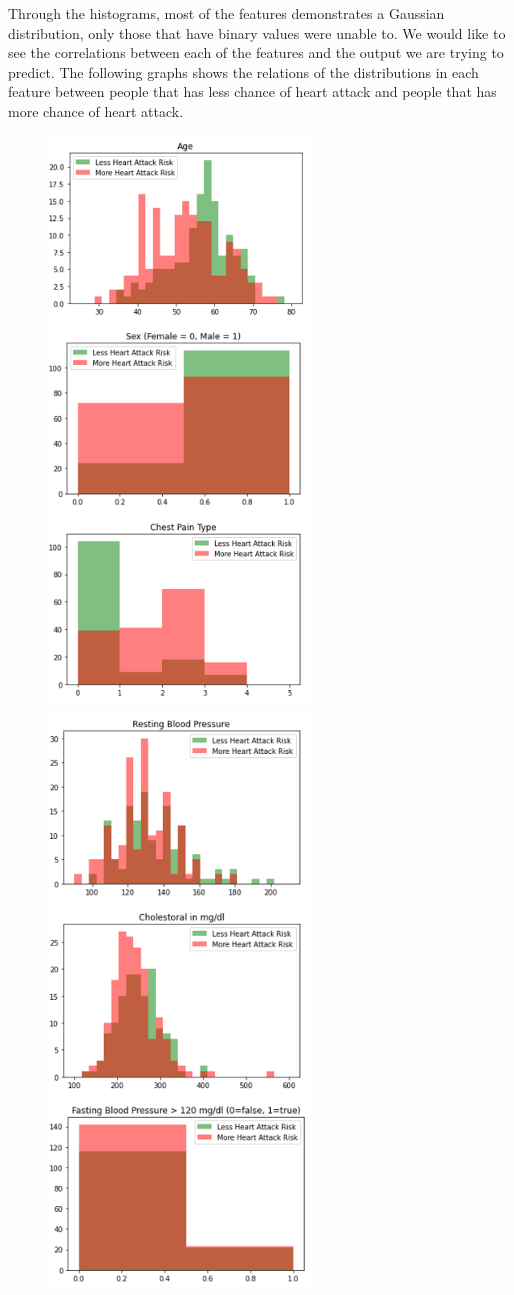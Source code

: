 \documentclass[11pt, oneside]{article}
\begin{document}
\noindent
Through the histograms, most of the features demonstrates a Gaussian distribution, only those that have binary values were unable to. We would like to see the correlations between each of the features and the output we are trying to predict. The following graphs shows the relations of the distributions in each feature between people that has less chance of heart attack and people that has more chance of heart attack.
\begin{figure}[H]
    \centering
    \includegraphics[width=7cm]{Corr1.png}
    \includegraphics[width=7cm]{Corr2.png}
\end{figure}
\end{document}
